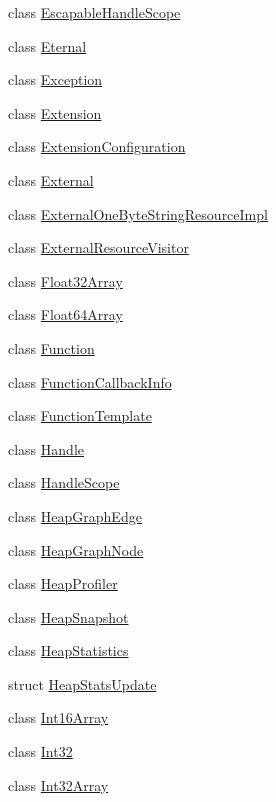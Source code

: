 \begin{DoxyCompactItemize}
\item 
class \hyperlink{classv8_1_1EscapableHandleScope}{Escapable\+Handle\+Scope}
\item 
class \hyperlink{classv8_1_1Eternal}{Eternal}
\item 
class \hyperlink{classv8_1_1Exception}{Exception}
\item 
class \hyperlink{classv8_1_1Extension}{Extension}
\item 
class \hyperlink{classv8_1_1ExtensionConfiguration}{Extension\+Configuration}
\item 
class \hyperlink{classv8_1_1External}{External}
\item 
class \hyperlink{classv8_1_1ExternalOneByteStringResourceImpl}{External\+One\+Byte\+String\+Resource\+Impl}
\item 
class \hyperlink{classv8_1_1ExternalResourceVisitor}{External\+Resource\+Visitor}
\item 
class \hyperlink{classv8_1_1Float32Array}{Float32\+Array}
\item 
class \hyperlink{classv8_1_1Float64Array}{Float64\+Array}
\item 
class \hyperlink{classv8_1_1Function}{Function}
\item 
class \hyperlink{classv8_1_1FunctionCallbackInfo}{Function\+Callback\+Info}
\item 
class \hyperlink{classv8_1_1FunctionTemplate}{Function\+Template}
\item 
class \hyperlink{classv8_1_1Handle}{Handle}
\item 
class \hyperlink{classv8_1_1HandleScope}{Handle\+Scope}
\item 
class \hyperlink{classv8_1_1HeapGraphEdge}{Heap\+Graph\+Edge}
\item 
class \hyperlink{classv8_1_1HeapGraphNode}{Heap\+Graph\+Node}
\item 
class \hyperlink{classv8_1_1HeapProfiler}{Heap\+Profiler}
\item 
class \hyperlink{classv8_1_1HeapSnapshot}{Heap\+Snapshot}
\item 
class \hyperlink{classv8_1_1HeapStatistics}{Heap\+Statistics}
\item 
struct \hyperlink{structv8_1_1HeapStatsUpdate}{Heap\+Stats\+Update}
\item 
class \hyperlink{classv8_1_1Int16Array}{Int16\+Array}
\item 
class \hyperlink{classv8_1_1Int32}{Int32}
\item 
class \hyperlink{classv8_1_1Int32Array}{Int32\+Array}
\item 

\end{DoxyCompactItemize}
